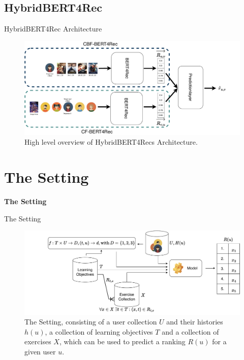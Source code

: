 \documentclass[en]{sdqbeamer}
\begin{document}
\subsection{HybridBERT4Rec}
\begin{frame}{HybridBERT4Rec Architecture}
	\begin{figure}
		\includegraphics[height=0.6\textheight]{images/hybridBERT4Rec_high_level.pdf}
		\caption{High level overview of HybridBERT4Recs Architecture. \cite{channarongHybridBERT4RecHybridContentBased2022}}
	\end{figure}
\end{frame}

\section{The Setting}

\begin{frame}
	\centering\textbf{\LARGE{The Setting}}
\end{frame}

\begin{frame}{The Setting}
	\begin{figure}
		\includegraphics[height=0.6\textheight]{images/setting.pdf}
		\caption{The Setting, consisting of a user collection $U$ and their histories $h(u)$, a collection of learning objectives $T$ and a collection of exercises $X$, which can be used to predict a ranking $R(u)$ for a given user $u$.}
	\end{figure}
\end{frame}
\end{document}
